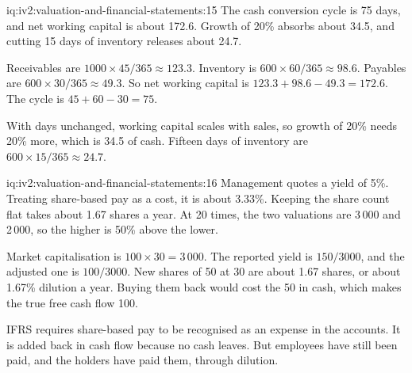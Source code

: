 \begin{solution}{iq:iv2:valuation-and-financial-statements:15}
The cash conversion cycle is 75 days, and net working capital is about 172.6. Growth of 20\% absorbs about 34.5, and cutting 15 days of inventory releases about 24.7.

Receivables are $1000 \times 45/365 \approx 123.3$. Inventory is $600 \times 60/365 \approx 98.6$. Payables are $600 \times 30/365 \approx 49.3$. So net working capital is $123.3 + 98.6 - 49.3 = 172.6$. The cycle is $45 + 60 - 30 = 75$.

With days unchanged, working capital scales with sales, so growth of 20\% needs 20\% more, which is 34.5 of cash. Fifteen days of inventory are $600 \times 15/365 \approx 24.7$.

\end{solution}

\begin{solution}{iq:iv2:valuation-and-financial-statements:16}
Management quotes a yield of 5\%. Treating share-based pay as a cost, it is about 3.33\%. Keeping the share count flat takes about 1.67 shares a year. At 20 times, the two valuations are 3\,000 and 2\,000, so the higher is 50\% above the lower.

Market capitalisation is $100 \times 30 = 3\,000$. The reported yield is $150/3000$, and the adjusted one is $100/3000$. New shares of 50 at 30 are about 1.67 shares, or about 1.67\% dilution a year. Buying them back would cost the 50 in cash, which makes the true free cash flow 100.

IFRS requires share-based pay to be recognised as an expense in the accounts. It is added back in cash flow because no cash leaves. But employees have still been paid, and the holders have paid them, through dilution.

\end{solution}

